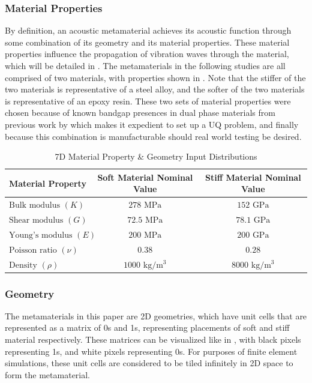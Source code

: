 \documentclass[preprint,review,12pt]{elsarticle}
\begin{document}
\subsubsection{Material Properties}
By definition, an acoustic metamaterial achieves its acoustic function through some combination of its geometry and its material properties. These material properties influence the propagation of vibration waves through the material, which will be detailed in . The metamaterials in the following studies are all comprised of two materials, with properties shown in . Note that the stiffer of the two materials is representative of a steel alloy, and the softer of the two materials is representative of an epoxy resin. These two sets of material properties were chosen because of known bandgap presences in dual phase materials from previous work by \citep{CHEN2022101895} which makes it expedient to set up a UQ problem, and finally because this combination is manufacturable should real world testing be desired.

\begin{table}[H]
\centering
\small
\caption{7D Material Property \& Geometry Input Distributions}
\label{table:Material Properties}
\begin{tabularx}{\linewidth}{Xcc} 
\toprule
Material Property & Soft Material Nominal Value & Stiff Material Nominal Value \\
\midrule
\( \text{Bulk modulus } (K)\) & \( 278 \text{ MPa} \) & \( 152 \text{ GPa} \) \\
\( \text{Shear modulus } (G)\) & \( 72.5 \text{ MPa} \) & \( 78.1 \text{ GPa} \) \\
\( \text{Young's modulus } (E)\) & \( 200 \text{ MPa} \) & \( 200 \text{ GPa} \) \\
\( \text{Poisson ratio } (\nu)\) & \( 0.38 \) & \( 0.28 \) \\
\( \text{Density } (\rho)\) & \( 1000 \text{ kg/m$^3$} \) & \( 8000 \text{ kg/m$^3$} \) \\
\bottomrule
\end{tabularx}
\end{table}
\subsubsection{Geometry}
The metamaterials in this paper are 2D geometries, which have unit cells that are represented as a matrix of 0s and 1s, representing placements of soft and stiff material respectively. These matrices can be visualized like in , with black pixels representing 1s, and white pixels representing 0s. For purposes of finite element simulations, these unit cells are considered to be tiled infinitely in 2D space to form the metamaterial.
\end{document}
